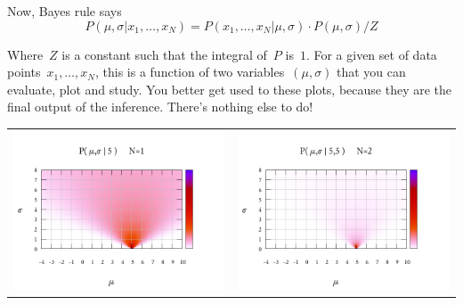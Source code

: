 Now, Bayes rule says
$$
P(\mu,\sigma|x_1,\ldots,x_N)=
P(x_1,\ldots,x_N|\mu,\sigma)\cdot P(\mu,\sigma)/Z
$$

Where~$Z$ is a constant such that the integral of~$P$ is~$1$.
For a given set of data points~$x_1,\ldots,x_N$, this is a function of two
variables~$(\mu,\sigma)$ that you can evaluate, plot and study.
You better get used to these plots, because they are the final output of the
inference.  There's nothing else to do!

\begin{tabular}{ll}
	\includegraphics{bayes1.png}&
	\includegraphics{bayes2.png}\\

\end{tabular}
